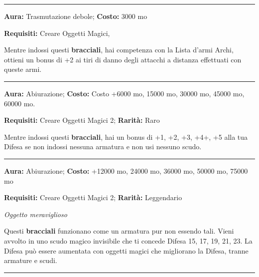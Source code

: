 \begin{multicols}{2}
\smallskip\noindent\rule{\linewidth}{2pt}  \hypertarget{Braccialidell'Arciere}{}\medskip{}\noindent\label{Braccialidell'Arciere}

\textbf{Aura:} Trasmutazione debole; \textbf{Costo:} 3000 mo

\textbf{Requisiti:} Creare Oggetti Magici,


Mentre indossi questi \textbf{bracciali}, hai competenza con la Lista d'armi Archi, ottieni un bonus di +2 ai tiri di danno degli attacchi a distanza effettuati con queste armi.

\smallskip\noindent\rule{\linewidth}{2pt}  \hypertarget{BraccialidellaDifesa}{}\medskip{}\noindent\label{BraccialidellaDifesa}

\textbf{Aura:} Abiurazione; \textbf{Costo:}  Costo +6000 mo, 15000 mo, 30000 mo, 45000 mo, 60000 mo.

\textbf{Requisiti:} Creare Oggetti Magici 2; \textbf{Rarità:} Raro

Mentre indossi questi \textbf{bracciali}, hai un bonus di +1, +2, +3, +4+, +5 alla tua Difesa se non indossi nessuna armatura e non usi nessuno scudo.

\smallskip\noindent\rule{\linewidth}{2pt}  \hypertarget{BraccialidellaDifesaMaggiore}{}\medskip{}\noindent\label{BraccialidellaDifesaMaggiore}

\textbf{Aura:} Abiurazione;  \textbf{Costo:}  +12000 mo, 24000 mo, 36000 mo, 50000 mo, 75000 mo

\textbf{Requisiti:} Creare Oggetti Magici 2; \textbf{Rarità:} Leggendario

\emph{Oggetto meraviglioso}

Questi \textbf{bracciali} funzionano come un armatura pur non essendo tali. Vieni avvolto in uno scudo magico invisibile che ti concede Difesa 15, 17, 19, 21, 23. La Difesa può essere aumentata con oggetti magici che migliorano la Difesa, tranne armature e scudi.

\smallskip\noindent\rule{\linewidth}{2pt}  \hypertarget{BracieredelComandodegliElementalidelFuoco}{}\medskip{}\noindent\label{BracieredelComandodegliElementalidelFuoco}


\end{multicols}
